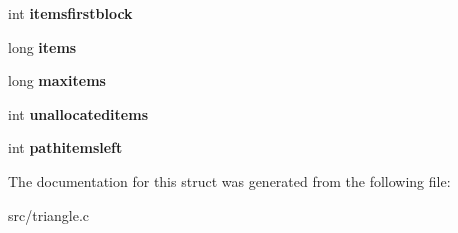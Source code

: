 \begin{DoxyCompactItemize}
\item 
\hypertarget{structmemorypool_aea58af830e899435d7f9547fd8920c3f}{
int {\bfseries itemsfirstblock}}
\label{structmemorypool_aea58af830e899435d7f9547fd8920c3f}

\item 
\hypertarget{structmemorypool_a9a59491a2dbbb46ae00b494a2652404f}{
long {\bfseries items}}
\label{structmemorypool_a9a59491a2dbbb46ae00b494a2652404f}

\item 
\hypertarget{structmemorypool_a851a3bc61c20c58ba0da9b8e45e7ab3d}{
long {\bfseries maxitems}}
\label{structmemorypool_a851a3bc61c20c58ba0da9b8e45e7ab3d}

\item 
\hypertarget{structmemorypool_ae407db4294305e97b4072f6117f2bfa9}{
int {\bfseries unallocateditems}}
\label{structmemorypool_ae407db4294305e97b4072f6117f2bfa9}

\item 
\hypertarget{structmemorypool_a34c47ac30b534652a93e9d3f742648ff}{
int {\bfseries pathitemsleft}}
\label{structmemorypool_a34c47ac30b534652a93e9d3f742648ff}

\end{DoxyCompactItemize}


The documentation for this struct was generated from the following file:\begin{DoxyCompactItemize}
\item 
src/triangle.c\end{DoxyCompactItemize}
